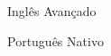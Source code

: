 

\begin{cvskills}

  \cvskill
    {Inglês} %
    {Avançado} %

  \cvskill
    {Português} %
    {Nativo} %

\end{cvskills}
